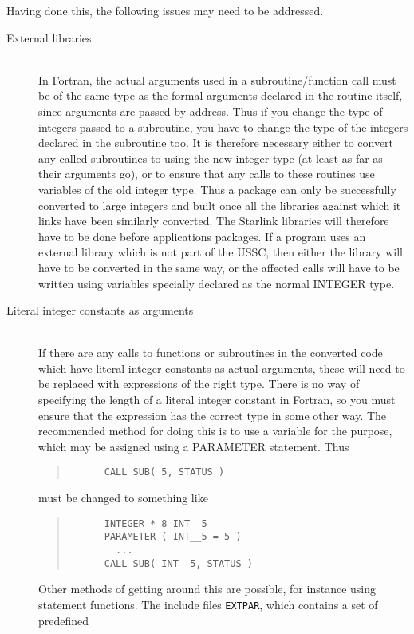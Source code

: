 \documentclass[twoside,11pt]{article}
\newcommand{\html}[1]{}
\renewcommand{\_}{\texttt{\symbol{95}}}
\newcommand{\file}[1]{{\tt #1}}
\newcommand{\ditem}[1]{\item[#1]\mbox{}\\}
\newenvironment{squote}{\begin{quote}\begin{small}}{\end{small}\end{quote}}
\begin{document}
Having done this, the following issues may need to be addressed.
\begin{description}
%
\ditem{External libraries}
In Fortran, the actual arguments used in a subroutine/function
call must be of the same type as the formal arguments declared
in the routine itself, since arguments are passed by address.
Thus if you change the type of integers passed to a subroutine,
you have to change the type of the integers declared in the subroutine too.
It is therefore necessary either to convert any called subroutines
to using the new integer type (at least as far as their arguments go),
or to ensure that any calls to these routines use variables of
the old integer type.
Thus a package can only be successfully converted to large integers
and built once all the libraries against which it links have been
similarly converted.  The Starlink libraries will therefore have to
be done before applications packages.
If a program uses an external library which is not part of the USSC,
then either the library will have to be converted in the same way,
or the affected calls will have to be written using
variables specially declared as the normal INTEGER type.
\html{\begin{squote}\end{squote}}
%
\ditem{Literal integer constants as arguments}
If there are any calls to functions or subroutines in the converted
code which have literal integer constants as actual arguments,
these will need to be replaced with expressions of the right type.
There is no way of specifying the length of a literal integer constant
in Fortran, so you must ensure that the expression has the correct type
in some other way.
The recommended method for doing this is to use a variable for the
purpose, which may be assigned using a PARAMETER statement.
Thus
\begin{squote}
\begin{verbatim}
      CALL SUB( 5, STATUS )
\end{verbatim}
\end{squote}
must be changed to something like
\begin{squote}
\begin{verbatim}
      INTEGER * 8 INT__5
      PARAMETER ( INT__5 = 5 )
        ...
      CALL SUB( INT__5, STATUS )
\end{verbatim}
\end{squote}
Other methods of getting around this are possible,
for instance using statement functions.
The include files \file{EXT\_PAR}, which contains a set of predefined

\end{description}
\end{document}
